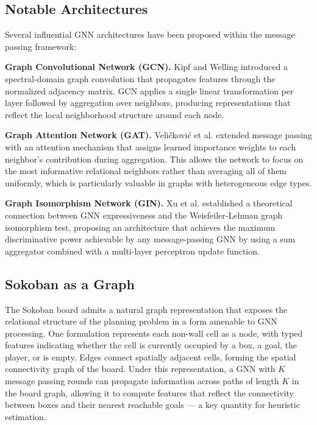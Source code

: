 \subsection{Notable Architectures}

Several influential GNN architectures have been proposed within the message passing framework:

\textbf{Graph Convolutional Network (GCN).} Kipf and Welling \cite{kipf2017semi} introduced a spectral-domain graph convolution that propagates features through the normalized adjacency matrix. GCN applies a single linear transformation per layer followed by aggregation over neighbors, producing representations that reflect the local neighborhood structure around each node.

\textbf{Graph Attention Network (GAT).} Veli\v{c}kovi\'{c} et al. \cite{velickovic2018graph} extended message passing with an attention mechanism that assigns learned importance weights to each neighbor's contribution during aggregation. This allows the network to focus on the most informative relational neighbors rather than averaging all of them uniformly, which is particularly valuable in graphs with heterogeneous edge types.

\textbf{Graph Isomorphism Network (GIN).} Xu et al. \cite{xu2019how} established a theoretical connection between GNN expressiveness and the Weisfeiler-Lehman graph isomorphism test, proposing an architecture that achieves the maximum discriminative power achievable by any message-passing GNN by using a sum aggregator combined with a multi-layer perceptron update function.

\subsection{Sokoban as a Graph}

The Sokoban board admits a natural graph representation that exposes the relational structure of the planning problem in a form amenable to GNN processing. One formulation represents each non-wall cell as a node, with typed features indicating whether the cell is currently occupied by a box, a goal, the player, or is empty. Edges connect spatially adjacent cells, forming the spatial connectivity graph of the board. Under this representation, a GNN with $K$ message passing rounds can propagate information across paths of length $K$ in the board graph, allowing it to compute features that reflect the connectivity between boxes and their nearest reachable goals --- a key quantity for heuristic estimation.

